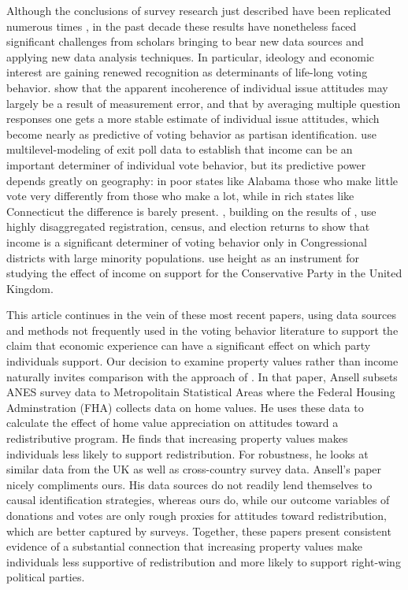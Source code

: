 Although the conclusions of survey research just described have been replicated numerous times \parencite{Nie1976,Smith989,LewisBeck2008}, in the past decade these results have nonetheless faced significant challenges from scholars bringing to bear new data sources and applying new data analysis techniques. In particular, ideology and economic interest are gaining renewed recognition as determinants of life-long voting behavior. \textcite{Ansolabehere2008} show that the apparent incoherence of individual issue attitudes may largely be a result of measurement error, and that by averaging multiple question responses one gets a more stable estimate of individual issue attitudes, which become nearly as predictive of voting behavior as partisan identification.  \textcite{Gelman2007} use multilevel-modeling of exit poll data to establish that income can be an important determiner of individual vote behavior, but its predictive power depends greatly on geography: in poor states like Alabama those who make little vote very differently from those who make a lot, while in rich states like Connecticut the difference is barely present. \textcite{Hersh2015}, building on the results of \textcite{Gelman2007}, use highly disaggregated registration, census, and election returns to show that income is a significant determiner of voting behavior only in Congressional districts with large minority populations. \citeauthor{Arunchalam} use height as an instrument for studying the effect of income on support for the Conservative Party in the United Kingdom. 

This article continues in the vein of these most recent papers, using data sources and methods not frequently used in the voting behavior literature to support the claim that economic experience can have a significant effect on which party individuals support. Our decision to examine property values rather than income naturally invites comparison with the approach of \textcite{Ansell2014}. In that paper, Ansell subsets ANES survey data to Metropolitain Statistical Areas where the Federal Housing Adminstration (FHA) collects data on home values. He uses these data to calculate the effect of home value appreciation on attitudes toward a redistributive program. He finds that increasing property values makes individuals less likely to support redistribution. For robustness, he looks at similar data from the UK as well as cross-country survey data. Ansell's paper nicely compliments ours. His data sources do not readily lend themselves to causal identification strategies, whereas ours do, while our outcome variables of donations and votes are only rough proxies for attitudes toward redistribution, which are better captured by surveys. Together, these papers present consistent evidence of a substantial connection that increasing property values make individuals less supportive of redistribution and more likely to support right-wing political parties. 

